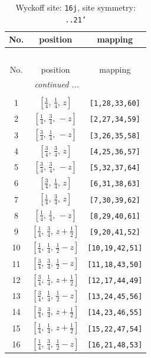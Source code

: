 \documentclass[fleqn,8pt]{jsarticle}
\begin{document}
\begin{longtable}{ccc}
\caption{Wyckoff site: {\tt 16j}, site symmetry: {\tt ..21'}}
 \\
 \hline \hline
No. & position & mapping \\ \hline \endfirsthead

\multicolumn{2}{l}{\tablename\ \thetable{}} \\
 \hline \hline
No. & position & mapping \\ \hline \endhead

 \hline \hline
\multicolumn{2}{r}{\footnotesize\it continued ...} \\ \endfoot

 \hline \hline
\multicolumn{2}{r}{} \\ \endlastfoot

1 & $\left[ \frac{1}{4},\, \frac{1}{4},\, z \right]$ & {\tt [1,28,33,60]} \\ \hline
2 & $\left[ \frac{1}{4},\, \frac{3}{4},\, - z \right]$ & {\tt [2,27,34,59]} \\ \hline
3 & $\left[ \frac{3}{4},\, \frac{1}{4},\, - z \right]$ & {\tt [3,26,35,58]} \\ \hline
4 & $\left[ \frac{3}{4},\, \frac{3}{4},\, z \right]$ & {\tt [4,25,36,57]} \\ \hline
5 & $\left[ \frac{3}{4},\, \frac{3}{4},\, - z \right]$ & {\tt [5,32,37,64]} \\ \hline
6 & $\left[ \frac{3}{4},\, \frac{1}{4},\, z \right]$ & {\tt [6,31,38,63]} \\ \hline
7 & $\left[ \frac{1}{4},\, \frac{3}{4},\, z \right]$ & {\tt [7,30,39,62]} \\ \hline
8 & $\left[ \frac{1}{4},\, \frac{1}{4},\, - z \right]$ & {\tt [8,29,40,61]} \\ \hline
9 & $\left[ \frac{1}{4},\, \frac{3}{4},\, z + \frac{1}{2} \right]$ & {\tt [9,20,41,52]} \\ \hline
10 & $\left[ \frac{1}{4},\, \frac{1}{4},\, \frac{1}{2} - z \right]$ & {\tt [10,19,42,51]} \\ \hline
11 & $\left[ \frac{3}{4},\, \frac{3}{4},\, \frac{1}{2} - z \right]$ & {\tt [11,18,43,50]} \\ \hline
12 & $\left[ \frac{3}{4},\, \frac{1}{4},\, z + \frac{1}{2} \right]$ & {\tt [12,17,44,49]} \\ \hline
13 & $\left[ \frac{3}{4},\, \frac{1}{4},\, \frac{1}{2} - z \right]$ & {\tt [13,24,45,56]} \\ \hline
14 & $\left[ \frac{3}{4},\, \frac{3}{4},\, z + \frac{1}{2} \right]$ & {\tt [14,23,46,55]} \\ \hline
15 & $\left[ \frac{1}{4},\, \frac{1}{4},\, z + \frac{1}{2} \right]$ & {\tt [15,22,47,54]} \\ \hline
16 & $\left[ \frac{1}{4},\, \frac{3}{4},\, \frac{1}{2} - z \right]$ & {\tt [16,21,48,53]} \\
\end{longtable}
\end{document}
